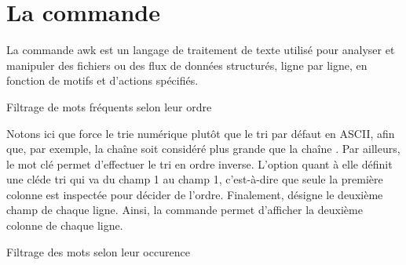 \documentclass[a4paper, 14pt]{report}
\begin{document}
    \section{La commande }
    \begin{Définition}
        La commande awk est un langage de traitement de texte utilisé pour
        analyser et manipuler des fichiers ou des flux de données structurés, ligne
        par ligne, en fonction de motifs et d'actions spécifiés.
    \end{Définition}
    \vspace{2em}
    \begin{Exemple}{Filtrage de mots fréquents selon leur ordre}{}
    \begin{center}
        \begin{adjustbox}{max width=\linewidth}
        \end{adjustbox}
    \end{center}                    
    \end{Exemple}

    Notons ici que  force le trie 
    numérique plutôt que le tri par défaut en ASCII, afin que, 
    par exemple, la chaîne \guillemotright 
     soit considéré plus grande que 
    la chaîne \guillemotright. Par ailleurs,
    le mot clé  permet 
    d'effectuer le tri en ordre inverse. L'option 
     quant à elle 
    définit une \guillemotleft clé\guillemotright de tri 
    qui va du champ 1 au champ 1, c'est-à-dire que seule 
    la première colonne est inspectée pour décider de l'ordre. 
    Finalement,  désigne 
    le deuxième champ de chaque ligne. Ainsi, la commande 
    permet d'afficher la deuxième colonne de chaque ligne. 


    \begin{Exemple}{Filtrage des mots selon leur occurence}
        \begin{center}
            \begin{adjustbox}{max width=\linewidth}
            \end{adjustbox}
        \end{center}
    \end{Exemple}
    
\end{document}
